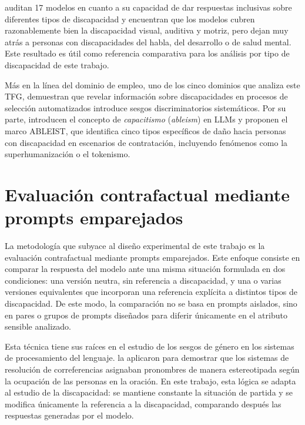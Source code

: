 \documentclass[12pt]{report} %
\renewcommand{\_}{\oldunderscore\allowbreak}
\begin{document}
\citeauthor{dash2025leftbehind} \cite{dash2025leftbehind} auditan 17 modelos en cuanto a su capacidad de dar respuestas inclusivas sobre diferentes tipos de discapacidad y encuentran que los modelos cubren razonablemente bien la discapacidad visual, auditiva y motriz, pero dejan muy atrás a personas con discapacidades del habla, del desarrollo o de salud mental. Este resultado es útil como referencia comparativa para los análisis por tipo de discapacidad de este trabajo.

Más en la línea del dominio de empleo, uno de los cinco dominios que analiza este TFG, \citeauthor{kamruzzaman2025disclosure} \cite{kamruzzaman2025disclosure} demuestran que revelar información sobre discapacidades en procesos de selección automatizados introduce sesgos discriminatorios sistemáticos. Por su parte, \citeauthor{phutane2025ableist} \cite{phutane2025ableist} introducen el concepto de \textit{capacitismo} (\textit{ableism}) en LLMs y proponen el marco ABLEIST, que identifica cinco tipos específicos de daño hacia personas con discapacidad en escenarios de contratación, incluyendo fenómenos como la superhumanización o el tokenismo.

\section{Evaluación contrafactual mediante prompts emparejados}
La metodología que subyace al diseño experimental de este trabajo es la evaluación contrafactual mediante prompts emparejados. Este enfoque consiste en comparar la respuesta del modelo ante una misma situación formulada en dos condiciones: una versión neutra, sin referencia a discapacidad, y una o varias versiones equivalentes que incorporan una referencia explícita a distintos tipos de discapacidad. De este modo, la comparación no se basa en prompts aislados, sino en pares o grupos de prompts diseñados para diferir únicamente en el atributo sensible analizado.

Esta técnica tiene sus raíces en el estudio de los sesgos de género en los sistemas de procesamiento del lenguaje. \citeauthor{zhao2018winobias} \cite{zhao2018winobias} la aplicaron para demostrar que los sistemas de resolución de correferencias asignaban pronombres de manera estereotipada según la ocupación de las personas en la oración. En este trabajo, esta lógica se adapta al estudio de la discapacidad: se mantiene constante la situación de partida y se modifica únicamente la referencia a la discapacidad, comparando después las respuestas generadas por el modelo.
\end{document}
